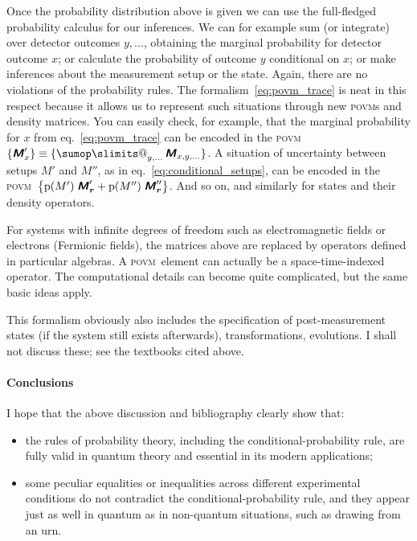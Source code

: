 \documentclass[\ifafour a4paper,12pt,\else a5paper,10pt,\fi%
onecolumn,oneside,article,%
british%
]{memoir}
\makeatletter
\theoremstyle{remark}
\theoremstyle{innote}
\def\sum{\DOTSI\sumop\slimits@}
\newcommand*{\mathte}[1]{\textbf{\textit{\textsf{#1}}}}
\DeclarePairedDelimiter\set{\{}{\}}
\newcommand*{\pf}{\mathrm{p}}%
\renewcommand*{\|}[1][]{\nonscript\,#1\vert\nonscript\;\mathopen{}}
\newcommand*{\eqn}{eq.}%
\newcommand*{\tsum}{\mathop{\textstyle\sum}\nolimits}
\newcommand*{\yM}{\mathte{M}}
\newcommand*{\povm}{\textsc{povm}}
\newcommand*{\ybr}{\bm{r}}
\makeatother
\begin{document}
Once the probability distribution above is given we can use the
full-fledged probability calculus for our inferences. We can for example
sum (or integrate) over detector outcomes $y,\dotsc{}$, obtaining the
marginal probability for detector outcome $x$; or calculate the probability
of outcome $y$ conditional on $x$; or make inferences about the measurement
setup or the state. Again, there are no violations of the probability
rules. The formalism~\eqref{eq:povm_trace} is neat in this respect because
it allows us to represent such situations through new \povm s and density
matrices. You can easily check, for example, that the marginal probability
for $x$ from \eqn~\eqref{eq:povm_trace} can be encoded in the \povm\
$\set{\yM'_{x}} \equiv \set{\tsum_{y,\dotsc}\yM_{x,y,\dotsc}}$. A situation
of uncertainty between setups $M'$ and $M''$, as in
\eqn~\eqref{eq:conditional_setups}, can be encoded in the \povm\
$\set[\big]{\pf(M')\;\yM'_{\ybr} + \pf(M'')\;\yM''_{\ybr}}$. And so on, and
similarly for states and their density operators.

For systems with infinite degrees of freedom such as electromagnetic fields
or electrons (Fermionic fields), the matrices above are replaced by
operators defined in particular algebras. A \povm\ element can actually be
a space-time-indexed operator. The computational details can become quite
complicated, but the same basic ideas apply.

This formalism obviously also includes the specification of
post-measurement states (if the system still exists afterwards),
transformations, evolutions. I shall not discuss these; see the textbooks
cited above.

\bigskip

\paragraph{Conclusions}

I hope that the above discussion and bibliography clearly show that:
\begin{itemize}
\item the rules of probability theory, including the
  conditional-probability rule, are fully valid in quantum theory and
  essential in its modern applications;
\item some peculiar equalities or inequalities across different
  experimental conditions do not contradict the conditional-probability
  rule, and they appear just as well in quantum as in non-quantum
  situations, such as drawing from an urn.
\end{itemize}
\end{document}
